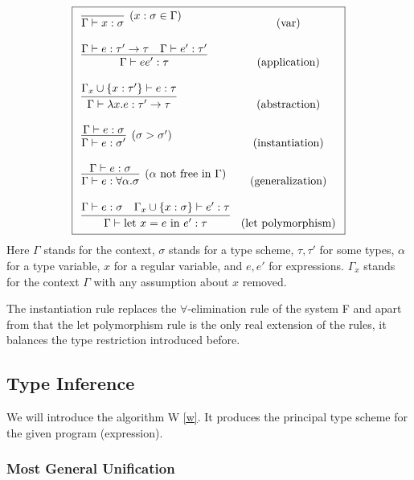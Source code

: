\begin{defn}
    $$\boxed{\begin{array}{l c}
        \infer[(x : \sigma \in \Gamma)]{\Gamma \vdash x : \sigma}{} & (\text{var}) \\\\
        \infer{\Gamma \vdash e e' : \tau}{\Gamma \vdash e : \tau' \rightarrow \tau \quad \Gamma \vdash e' : \tau'} & (\text{application}) \\\\
        \infer{\Gamma \vdash \lambda x . e : \tau' \rightarrow \tau}{\Gamma_x \cup \{x : \tau'\} \vdash e : \tau} & (\text{abstraction}) \\\\
        \infer[(\sigma > \sigma')]{\Gamma \vdash e : \sigma'}{\Gamma \vdash e : \sigma} & (\text{instantiation}) \\\\
        \infer[(\alpha \text{ not free in }\Gamma)]{\Gamma \vdash e : \forall \alpha . \sigma}{\Gamma \vdash e : \sigma} & (\text{generalization}) \\\\
        \infer{\Gamma \vdash \text{let } x = e \text{ in } e' : \tau}{\Gamma \vdash e : \sigma \quad \Gamma_x \cup \{x :\sigma\} \vdash e' : \tau} & (\text{let polymorphism})
    \end{array}}$$
    Here $\Gamma$ stands for the context, $\sigma$ stands for a type scheme, $\tau, \tau'$ for some types, $\alpha$ for a type variable, $x$ for a regular variable, and $e, e'$ for expressions. $\Gamma_x$ stands for the context $\Gamma$ with any assumption about $x$ removed.
\end{defn}

The instantiation rule replaces the $\forall$-elimination rule of the system F and apart from that the let polymorphism rule is the only real extension of the rules, it balances the type restriction introduced before.

\subsection{Type Inference}

We will introduce the algorithm W \ref{w}. It produces the principal type scheme for the given program (expression).

\subsubsection{Most General Unification}

